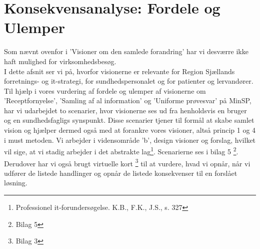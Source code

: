 %
%
%
%
%
%
%
%
%
%
%
%
%
%
%
%
%
%
%
%
%
%
%
%
%
%
%
%
%
%
%
\section{Konsekvensanalyse: Fordele og Ulemper}
Som nævnt ovenfor i 'Visioner om den samlede forandring' har vi desværre ikke haft mulighed for virksomhedsbesøg.\\
I dette afsnit ser vi på, hvorfor visionerne er relevante for Region Sjællands forretnings- og it-strategi, for sundhedspersonalet og for patienter og lervandører. \\
Til hjælp i vores vurdering af fordele og ulemper af visionerne om 'Receptfornyelse', 'Samling af al information' og 'Uniforme prøvesvar' på MinSP, har vi udarbejdet to scenarier, hvor visionerne ses ud fra henholdsvis en bruger og en sundhedsfagligs synspunkt. Disse scenarier tjener til formål at skabe samlet vision og hjælper dermed også med at forankre vores visioner, altså princip 1 og 4 i must metoden. Vi arbejder i vidensområde 'b', design visioner og forslag, hvilket vil sige, at vi stadig arbejder i det abstrakte lag\footnote{Professionel it-forundersøgelse. K.B., F.K., J.S., s. 327}. Scenarierne ses i bilag 5 \footnote{Bilag 5}. \\
Derudover har vi også brugt virtuelle kort \footnote{Bilag 3} til at vurdere, hvad vi opnår, når vi udfører de listede handlinger og opnår de listede konsekvenser til en forslået løsning.
